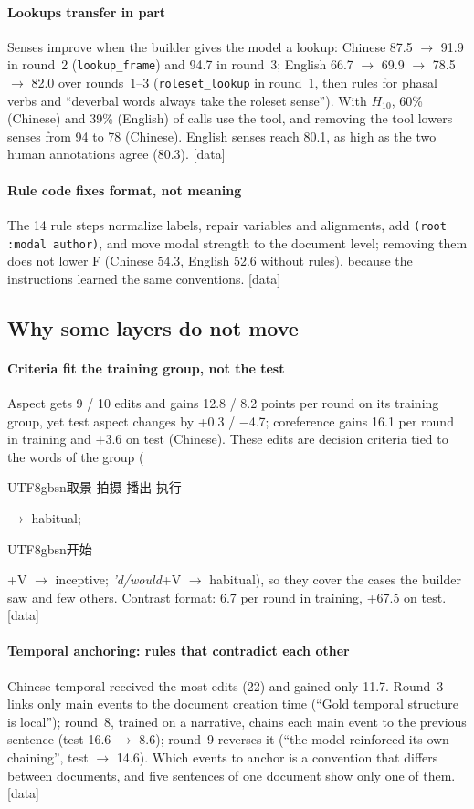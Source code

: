 \documentclass[11pt]{article}
\newcommand{\zh}[1]{\begin{CJK}{UTF8}{gbsn}#1\end{CJK}}
\newcommand{\stag}[2]{\textcolor{#1}{\textsf{\scriptsize[#2]}}}
\newcommand{\HAVE}{\stag{green!50!black}{data}\xspace}
\begin{document}
\paragraph{Lookups transfer in part}
Senses improve when the builder gives the model a lookup: Chinese 87.5 $\rightarrow$ 91.9 in round~2 (\texttt{lookup\_frame}) and 94.7 in round~3; English 66.7 $\rightarrow$ 69.9 $\rightarrow$ 78.5 $\rightarrow$ 82.0 over rounds~1--3 (\texttt{roleset\_lookup} in round~1, then rules for phasal verbs and ``deverbal words always take the roleset sense''). With $H_{10}$, 60\% (Chinese) and 39\% (English) of calls use the tool, and removing the tool lowers senses from 94 to 78 (Chinese). English senses reach 80.1, as high as the two human annotations agree (80.3). \HAVE

\paragraph{Rule code fixes format, not meaning}
The 14 rule steps normalize labels, repair variables and alignments, add \texttt{(root :modal author)}, and move modal strength to the document level; removing them does not lower F (Chinese 54.3, English 52.6 without rules), because the instructions learned the same conventions. \HAVE

\subsection{Why some layers do not move}
\label{sec:cannot}

\paragraph{Criteria fit the training group, not the test}
Aspect gets 9 / 10 edits and gains 12.8 / 8.2 points per round on its training group, yet test aspect changes by +0.3 / $-$4.7; coreference gains 16.1 per round in training and +3.6 on test (Chinese). These edits are decision criteria tied to the words of the group (\zh{取景 拍摄 播出 执行} $\rightarrow$ habitual; \zh{开始}+V $\rightarrow$ inceptive; \emph{'d/would}+V $\rightarrow$ habitual), so they cover the cases the builder saw and few others. Contrast format: 6.7 per round in training, +67.5 on test. \HAVE

\paragraph{Temporal anchoring: rules that contradict each other}
Chinese temporal received the most edits (22) and gained only 11.7. Round~3 links only main events to the document creation time (``Gold temporal structure is local''); round~8, trained on a narrative, chains each main event to the previous sentence (test 16.6 $\rightarrow$ 8.6); round~9 reverses it (``the model reinforced its own chaining'', test $\rightarrow$ 14.6). Which events to anchor is a convention that differs between documents, and five sentences of one document show only one of them. \HAVE
\end{document}
